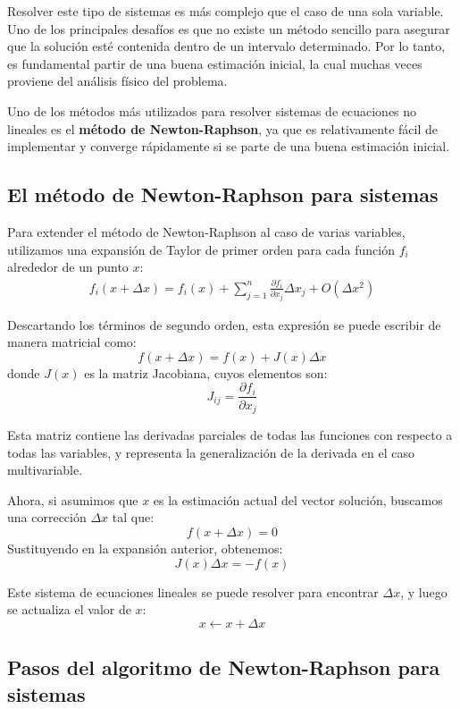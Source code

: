 \documentclass[12pt,letterpaper]{article}
\theoremstyle{definition}
\theoremstyle{plain}
\theoremstyle{remark}
\begin{document}
Resolver este tipo de sistemas es más complejo que el caso de una sola variable. Uno de los principales desafíos es que no existe un método sencillo para asegurar que la solución esté contenida dentro de un intervalo determinado. Por lo tanto, es fundamental partir de una buena estimación inicial, la cual muchas veces proviene del análisis físico del problema.

Uno de los métodos más utilizados para resolver sistemas de ecuaciones no lineales es el {\bf método de Newton-Raphson}, ya que es relativamente fácil de implementar y converge rápidamente si se parte de una buena estimación inicial.

\subsection{El método de Newton-Raphson para sistemas}

Para extender el método de Newton-Raphson al caso de varias variables, utilizamos una expansión de Taylor de primer orden para cada función $f_i$ alrededor de un punto $x$:
\begin{align}
f_i(x + \Delta x) = f_i(x) + \sum_{j=1}^n \frac{\partial f_i}{\partial x_j} \Delta x_j + O(\Delta x^2) \label{eq:11}
\end{align}

Descartando los términos de segundo orden, esta expresión se puede escribir de manera matricial como:
\[
f(x + \Delta x) = f(x) + J(x)\Delta x
\]
donde $J(x)$ es la matriz Jacobiana, cuyos elementos son:
\[
J_{ij} = \frac{\partial f_i}{\partial x_j}
\]

Esta matriz contiene las derivadas parciales de todas las funciones con respecto a todas las variables, y representa la generalización de la derivada en el caso multivariable.

Ahora, si asumimos que $x$ es la estimación actual del vector solución, buscamos una corrección $\Delta x$ tal que:
\[
f(x + \Delta x) = 0
\]
Sustituyendo en la expansión anterior, obtenemos:
\[
J(x)\Delta x = -f(x)
\]

Este sistema de ecuaciones lineales se puede resolver para encontrar $\Delta x$, y luego se actualiza el valor de $x$:
\[
x \leftarrow x + \Delta x
\]

\subsection*{Pasos del algoritmo de Newton-Raphson para sistemas}
\end{document}
